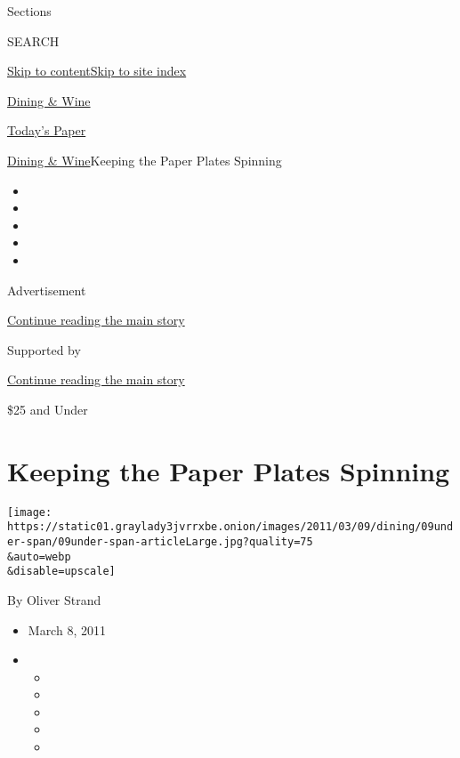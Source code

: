 Sections

SEARCH

\protect\hyperlink{site-content}{Skip to
content}\protect\hyperlink{site-index}{Skip to site index}

\href{https://www.nytimes3xbfgragh.onion/pages/dining/index.html}{Dining
\& Wine}

\href{https://myaccount.nytimes3xbfgragh.onion/auth/login?response_type=cookie\&client_id=vi}{}

\href{https://www.nytimes3xbfgragh.onion/section/todayspaper}{Today's
Paper}

\href{/pages/dining/index.html}{Dining \& Wine}\textbar{}Keeping the
Paper Plates Spinning

\begin{itemize}
\item
\item
\item
\item
\item
\end{itemize}

Advertisement

\protect\hyperlink{after-top}{Continue reading the main story}

Supported by

\protect\hyperlink{after-sponsor}{Continue reading the main story}

\$25 and Under

\hypertarget{keeping-the-paper-plates-spinning}{%
\section{Keeping the Paper Plates
Spinning}\label{keeping-the-paper-plates-spinning}}

\texttt{[image: https://static01.graylady3jvrrxbe.onion/images/2011/03/09/dining/09under-span/09under-span-articleLarge.jpg?quality=75\\\&auto=webp\\\&disable=upscale]}

By Oliver Strand

\begin{itemize}
\item
  March 8, 2011
\item
  \begin{itemize}
  \item
  \item
  \item
  \item
  \item
  \end{itemize}
\end{itemize}

